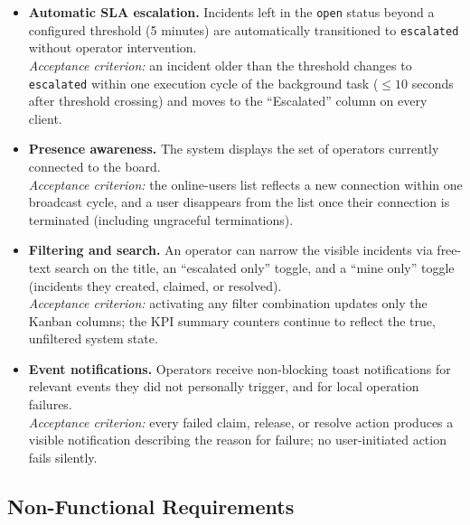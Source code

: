 \documentclass{scrartcl}
\begin{document}
\begin{itemize}
  \item[\textbf{FR7}] \textbf{Automatic SLA escalation.} Incidents left in the \texttt{open} status beyond a configured threshold (5 minutes) are automatically transitioned to \texttt{escalated} without operator intervention. \\
  \emph{Acceptance criterion:} an incident older than the threshold changes to \texttt{escalated} within one execution cycle of the background task ($\leq 10$ seconds after threshold crossing) and moves to the ``Escalated'' column on every client.

  \item[\textbf{FR8}] \textbf{Presence awareness.} The system displays the set of operators currently connected to the board. \\
  \emph{Acceptance criterion:} the online-users list reflects a new connection within one broadcast cycle, and a user disappears from the list once their connection is terminated (including ungraceful terminations).

  \item[\textbf{FR9}] \textbf{Filtering and search.} An operator can narrow the visible incidents via free-text search on the title, an ``escalated only'' toggle, and a ``mine only'' toggle (incidents they created, claimed, or resolved). \\
  \emph{Acceptance criterion:} activating any filter combination updates only the Kanban columns; the KPI summary counters continue to reflect the true, unfiltered system state.

  \item[\textbf{FR10}] \textbf{Event notifications.} Operators receive non-blocking toast notifications for relevant events they did not personally trigger, and for local operation failures. \\
  \emph{Acceptance criterion:} every failed claim, release, or resolve action produces a visible notification describing the reason for failure; no user-initiated action fails silently.
\end{itemize}

\subsection{Non-Functional Requirements}\label{non-functional-requirements}
\end{document}
